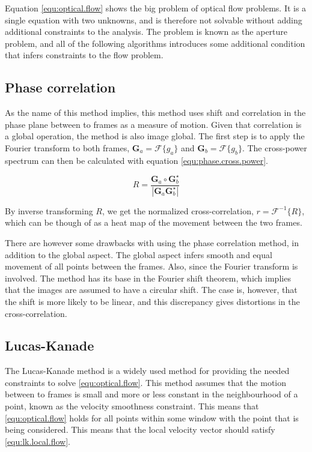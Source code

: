 Equation \eqref{equ:optical.flow} shows the big problem of optical flow problems. It is a single equation with two unknowns, and is therefore not 
solvable without adding additional constraints to the analysis. The problem is known as the aperture problem, and all of the following algorithms 
introduces some additional condition that infers constraints to the flow problem.

\subsection{Phase correlation}\label{sec:phase.correlation}
As the name of this method implies, this method uses shift and correlation in the phase plane between to frames as a measure of motion. Given that correlation is a global operation,
the method is also image global. The first step is to apply the Fourier transform to both frames, $\textbf{G}_a = \mathcal{F}\{g_a\}$ and $\textbf{G}_b = \mathcal{F}\{g_b\}$. The cross-power spectrum 
can then be calculated with equation \eqref{equ:phase.cross.power}.

\begin{equation}\label{equ:phase.cross.power}
	R = \frac{\textbf{G}_a \circ \textbf{G}_b^\star}{|\textbf{G}_a \textbf{G}_b^\star|}
\end{equation}

By inverse transforming $R$, we get the normalized cross-correlation, $r = \mathcal{F}^{-1}\{R\}$, which can be though of as a 
heat map of the movement between the two frames.

There are however some drawbacks with using the phase correlation method, in addition to the global aspect. The global aspect 
infers smooth and equal movement of all points between the frames. Also, since the Fourier transform is involved. The method has its base 
in the Fourier shift theorem, which implies that the images are assumed to have a circular shift. The case is, however, that the shift 
is more likely to be linear, and this discrepancy gives distortions in the cross-correlation.

\subsection{Lucas-Kanade}\label{sec:lukas-kanade}
The Lucas-Kanade method is a widely used method for providing the needed constraints to solve \eqref{equ:optical.flow}. This method assumes that 
the motion between to frames is small and more or less constant in the neighbourhood of a point, known as the velocity smoothness constraint. 
This means that \eqref{equ:optical.flow} holds for all points within some window
with the point that is being considered. This means that the local velocity vector should satisfy \eqref{equ:lk.local.flow}.

